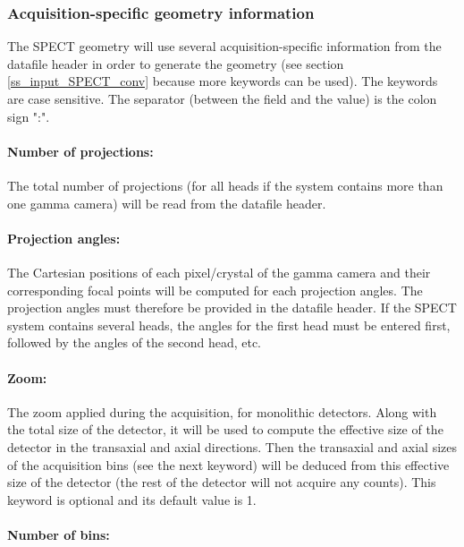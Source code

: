 \documentclass[a4paper, 11pt]{article}
\begin{document}
\subsubsection{Acquisition-specific geometry information}
\label{sss_SPECT_conv_acquisition_data}

The SPECT geometry will use several acquisition-specific information from the datafile header in order to generate the geometry (see
section \ref{ss_input_SPECT_conv} because more keywords can be used).
The keywords are case sensitive.
The separator (between the field and the value) is the colon sign ":".

\paragraph{Number of projections:}

The total number of projections (for all heads if the system contains more than one gamma camera) will be read from the datafile header.

\paragraph{Projection angles:}

The Cartesian positions of each pixel/crystal of the gamma camera and their corresponding focal points will be computed for each projection
angles. The projection angles must therefore be provided in the datafile header. If the SPECT system contains several heads, the angles for
the first head must be entered first, followed by the angles of the second head, etc.

\paragraph{Zoom:}

The zoom applied during the acquisition, for monolithic detectors. Along with the total size of the detector, it will be used to compute the effective
size of the detector in the transaxial and axial directions. Then the transaxial and axial sizes of the acquisition bins (see the next keyword) will
be deduced from this effective size of the detector (the rest of the detector will not acquire any counts).
This keyword is optional and its default value is 1.

\paragraph{Number of bins:}
\end{document}
